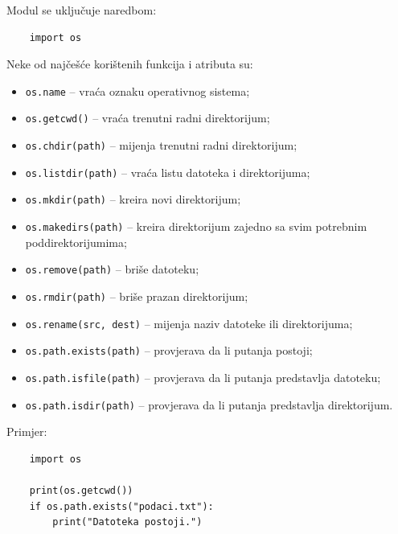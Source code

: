 Modul se uključuje naredbom:

\begin{verbatim}
	import os
\end{verbatim}

Neke od najčešće korištenih funkcija i atributa su:

\begin{itemize}
	\item \texttt{os.name} -- vraća oznaku operativnog sistema;
	\item \texttt{os.getcwd()} -- vraća trenutni radni direktorijum;
	
	\item \texttt{os.chdir(path)} -- mijenja trenutni radni direktorijum;
	
	\item \texttt{os.listdir(path)} -- vraća listu datoteka i direktorijuma;
	
	\item \texttt{os.mkdir(path)} -- kreira novi direktorijum;
	\item \texttt{os.makedirs(path)} -- kreira direktorijum zajedno sa svim potrebnim poddirektorijumima;
	
	\item \texttt{os.remove(path)} -- briše datoteku;
	
	\item \texttt{os.rmdir(path)} -- briše prazan direktorijum;
	
	\item \texttt{os.rename(src, dest)} -- mijenja naziv datoteke ili direktorijuma;
	
	\item \texttt{os.path.exists(path)} -- provjerava da li putanja postoji;
	
	\item \texttt{os.path.isfile(path)} -- provjerava da li putanja predstavlja datoteku;
	
	\item \texttt{os.path.isdir(path)} -- provjerava da li putanja predstavlja direktorijum.
	
\end{itemize}

Primjer:

\begin{verbatim}
	import os
	
	print(os.getcwd())
	if os.path.exists("podaci.txt"):
	    print("Datoteka postoji.")
\end{verbatim}

